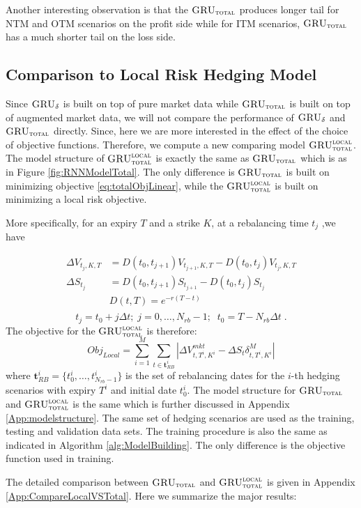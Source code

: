 \documentclass[letterpaper,12pt,titlepage,oneside,final]{book}
\numberwithin{equation}{section}
\theoremstyle{definition}
\newcommand{\model}{\textsc{GRU}_\delta}
\newcommand{\modelT}{\textsc{GRU}_{\textsc{total}}}
\newcommand{\modelL}{\textsc{GRU}_{\textsc{total}}^{\textsc{local}}}
\newcommand{\DS}{\Delta S}
\newcommand{\DT}{\Delta t}
\newcommand{\Smkt}{S}
\begin{document}
Another interesting observation is that the $\modelT$ produces longer tail for NTM and OTM scenarios on the profit side while for ITM scenarios, $\modelT$  has a much shorter tail on the loss side.
\subsection{Comparison to Local Risk Hedging Model}
Since $\model$ is built on top of pure market data while $\modelT$ is built on top of augmented market data, we will not compare the performance of  $\model$ and $\modelT$ directly. Since, here we are more interested in the effect of the choice of objective functions. Therefore, we compute a new comparing model $\modelL$. The model structure of $\modelL$ is exactly the same as  $\modelT$ which is as in Figure \ref{fig:RNNModelTotal}.  The only difference is $\modelT$ is built on minimizing objective \eqref{eq:totalObjLinear}, while the $\modelL$ is built on minimizing a local risk objective. 

More specifically, for an expiry $T$ and a strike $K$,  at a rebalancing time $t_j$ ,we have

\[
\begin{split}
\Delta V_{t_j,K,T}& =D(t_0,t_{j+1}) V_{t_{j+1},K,T}-D(t_0,t_{j})V_{t_j,K,T}\\
\Delta \Smkt_{t_j} &=D(t_0,t_{j+1}) \Smkt_{t_{j+1}}-D(t_0,t_{j}) \Smkt_{t_{j}}\\
&D(t,T)=e^{-r(T-t)}\\
\end{split}
\]
\[
t_j=t_0+j \Delta t;\; j=0,\dots,N_{rb}-1;\;\;t_0=T-N_{rb}\DT\;.
\]
The objective for the  $\modelL$  is therefore:
\begin{equation}
Obj_{Local}=\sum_{i=1}^M \sum_{t\in \mathbf{t}^i_{RB}} |\Delta V^{mkt}_{t,T^i,K^i}-\DS_{t} \delta^{M}_{t,T^i,K^i}|
\label{eq:LocalObjNew}
\end{equation}
where $\mathbf{t}^i_{RB}=\{t^i_0,\dots, t^i_{N_{rb}-1}\}$ is the set of rebalancing dates for the $i$-th hedging scenarios with expiry $T^i$ and initial date $t^i_0$. The model structure for $\modelT$ and  $\modelL$ is the same which is further discussed in Appendix \ref{App:modelstructure}. The same set of hedging scenarios are used as the training, testing and validation data sets. The training procedure is also the same as indicated in Algorithm \ref{alg:ModelBuilding}. The only difference is the objective function used in training.


The detailed comparison between $\modelT$ and $\modelL$ is given in Appendix \ref{App:CompareLocalVSTotal}. Here we summarize the major results:
\end{document}
